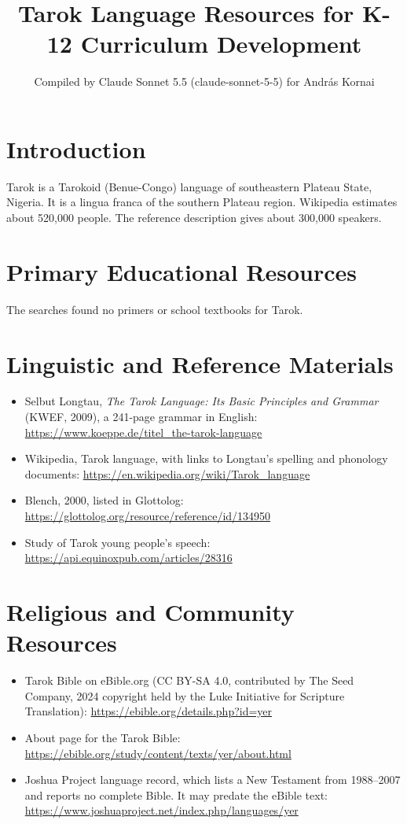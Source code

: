 \documentclass[12pt]{article}
\title{Tarok Language Resources for K-12 Curriculum Development}
\author{Compiled by Claude Sonnet 5.5 (claude-sonnet-5-5) for Andr\'as Kornai}
\date{}
\begin{document}
\maketitle

\section{Introduction}
Tarok is a Tarokoid (Benue-Congo) language of southeastern Plateau State, Nigeria. It is a lingua franca of the southern Plateau region. Wikipedia estimates about 520,000 people. The reference description gives about 300,000 speakers.

\section{Primary Educational Resources}
The searches found no primers or school textbooks for Tarok.

\section{Linguistic and Reference Materials}
\begin{itemize}
\item Selbut Longtau, \textit{The Tarok Language: Its Basic Principles and Grammar} (KWEF, 2009), a 241-page grammar in English: \url{https://www.koeppe.de/titel_the-tarok-language}
\item Wikipedia, Tarok language, with links to Longtau's spelling and phonology documents: \url{https://en.wikipedia.org/wiki/Tarok_language}
\item Blench, 2000, listed in Glottolog: \url{https://glottolog.org/resource/reference/id/134950}
\item Study of Tarok young people's speech: \url{https://api.equinoxpub.com/articles/28316}
\end{itemize}

\section{Religious and Community Resources}
\begin{itemize}
\item Tarok Bible on eBible.org (CC BY-SA 4.0, contributed by The Seed Company, 2024 copyright held by the Luke Initiative for Scripture Translation): \url{https://ebible.org/details.php?id=yer}
\item About page for the Tarok Bible: \url{https://ebible.org/study/content/texts/yer/about.html}
\item Joshua Project language record, which lists a New Testament from 1988--2007 and reports no complete Bible. It may predate the eBible text: \url{https://www.joshuaproject.net/index.php/languages/yer}
\end{itemize}
\end{document}
